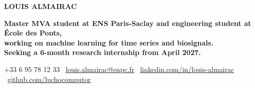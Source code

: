 \documentclass{resume} %
\begin{document}

\vspace{-1.5cm}
\begin{center}
    \noindent\textbf{\Large{\MakeUppercase{L}}\large{OUIS} \Large{ALMAIRAC}}
    
    \bfseries\vspace{0.05cm}
Master MVA student at ENS Paris-Saclay and engineering student at École des Ponts,\\ working on machine learning for time series and biosignals.\\ \vspace{0.05cm} {\normalfont Seeking a 6-month research internship from April 2027.}\\ \vspace{0.1cm} %
\end{center}
\begin{center}


    \vspace{-0.1cm}
    \begin{center}
\small
{
  +33 6 95 78 12 33 \vline\ \href{mailto:louis.almairac@enpc.fr}{louis.almairac@enpc.fr} \vline\ \href{https://www.linkedin.com/in/louis-almairac}{linkedin.com/in/louis-almairac} \vline\ \href{https://github.com/luchocomputor}{github.com/luchocomputor}
}
\end{center}

\end{center}


\end{document}
